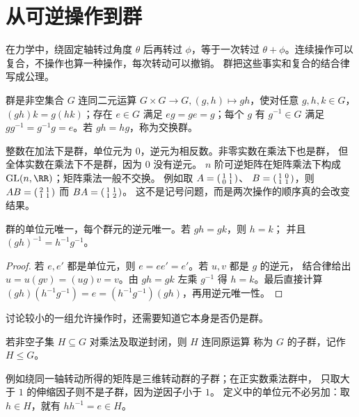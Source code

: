 \section{从可逆操作到群}
\label{sec:math-group-from-operations}

在力学中，绕固定轴转过角度 \(\theta\) 后再转过 \(\phi\)，等于一次转过
\(\theta+\phi\)。连续操作可以复合，不操作也算一种操作，每次转动可以撤销。
群把这些事实和复合的结合律写成公理。

\begin{definition}[群]
群是非空集合 \(G\) 连同二元运算
\(G\times G\to G,(g,h)\mapsto gh\)，使对任意 \(g,h,k\in G\)，
\((gh)k=g(hk)\)；存在 \(e\in G\) 满足 \(eg=ge=g\)；每个 \(g\) 有
\(g^{-1}\in G\) 满足 \(gg^{-1}=g^{-1}g=e\)。若 \(gh=hg\)，称为交换群。
\end{definition}

整数在加法下是群，单位元为 \(0\)，逆元为相反数。非零实数在乘法下也是群，
但全体实数在乘法下不是群，因为 \(0\) 没有逆元。
\(n\) 阶可逆矩阵在矩阵乘法下构成
\(\operatorname{GL}(n,\RR)\)；矩阵乘法一般不交换。
例如取
\(A=\begin{psmallmatrix}1&1\\0&1\end{psmallmatrix}\)、
\(B=\begin{psmallmatrix}1&0\\1&1\end{psmallmatrix}\)，则
\(AB=\begin{psmallmatrix}2&1\\1&1\end{psmallmatrix}\)
而 \(BA=\begin{psmallmatrix}1&1\\1&2\end{psmallmatrix}\)。
这不是记号问题，而是两次操作的顺序真的会改变结果。

\begin{proposition}
群的单位元唯一，每个群元的逆元唯一。若 \(gh=gk\)，则 \(h=k\)；
并且 \((gh)^{-1}=h^{-1}g^{-1}\)。
\end{proposition}
\begin{proof}
若 \(e,e'\) 都是单位元，则 \(e=ee'=e'\)。若 \(u,v\) 都是 \(g\) 的逆元，
结合律给出 \(u=u(gv)=(ug)v=v\)。由 \(gh=gk\) 左乘 \(g^{-1}\) 得
\(h=k\)。最后直接计算
\((gh)(h^{-1}g^{-1})=e=(h^{-1}g^{-1})(gh)\)，再用逆元唯一性。
\end{proof}

讨论较小的一组允许操作时，还需要知道它本身是否仍是群。
\begin{definition}[子群]
若非空子集 \(H\subseteq G\) 对乘法及取逆封闭，则 \(H\) 连同原运算
称为 \(G\) 的子群，记作 \(H\leq G\)。
\end{definition}
例如绕同一轴转动所得的矩阵是三维转动群的子群；在正实数乘法群中，
只取大于 \(1\) 的伸缩因子则不是子群，因为逆因子小于 \(1\)。
定义中的单位元不必另加：取 \(h\in H\)，就有
\(hh^{-1}=e\in H\)。


